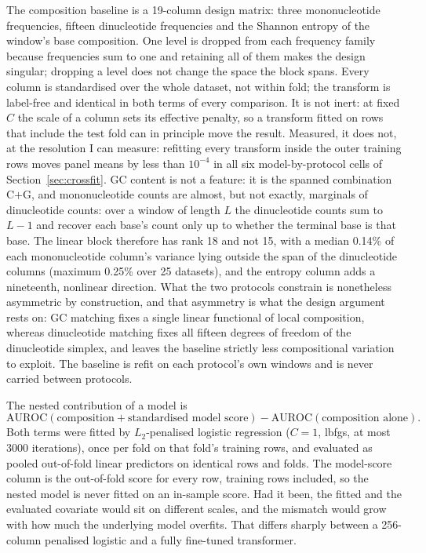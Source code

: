 The composition baseline is a 19-column design matrix: three mononucleotide frequencies, fifteen
dinucleotide frequencies and the Shannon entropy of the window's base composition. One level is
dropped from each frequency family because frequencies sum to one and retaining all of them
makes the design singular; dropping a level does not change the space the block spans. Every
column is standardised over the whole dataset, not within fold; the transform is
label-free and identical in both terms of every comparison. It is not inert: at fixed $C$ the
scale of a column sets its effective penalty, so a transform fitted on rows that include the
test fold can in principle move the result. Measured, it does not, at the resolution I can
measure: refitting every transform inside the outer training rows moves panel means by less
than $10^{-4}$ in all six model-by-protocol cells of Section~\ref{sec:crossfit}. GC content is not a feature: it is the spanned combination C$+$G, and
mononucleotide counts are almost, but not exactly, marginals of dinucleotide counts: over a
window of length $L$ the dinucleotide counts sum to $L-1$ and recover each base's count only up
to whether the terminal base is that base. The linear block therefore has rank 18 and not 15,
with a median 0.14\% of each mononucleotide column's variance lying outside the span of the
dinucleotide columns (maximum 0.25\% over 25 datasets), and the entropy column adds a
nineteenth, nonlinear direction. What the two protocols constrain is nonetheless asymmetric by
construction, and that asymmetry is what the design argument rests on: GC matching fixes a
single linear functional of local composition, whereas dinucleotide matching fixes all fifteen
degrees of freedom of the dinucleotide simplex, and leaves the baseline strictly less
compositional variation to exploit. The baseline is refit on each protocol's own windows and is
never carried between protocols.

The nested contribution of a model is
\begin{equation*}
\mathrm{AUROC}(\text{composition} + \text{standardised model score}) -
\mathrm{AUROC}(\text{composition alone}).
\end{equation*}
Both terms were fitted by $L_2$-penalised logistic regression ($C=1$, lbfgs, at most 3000
iterations), once per fold on that fold's training rows, and evaluated as pooled out-of-fold
linear predictors on identical rows and folds. The model-score column is the out-of-fold score
for every row, training rows included, so the nested model is never fitted on an in-sample
score. Had it been, the fitted and the evaluated covariate would sit on different scales, and
the mismatch would grow with how much the underlying model overfits. That differs sharply
between a 256-column penalised logistic and a fully fine-tuned transformer.

